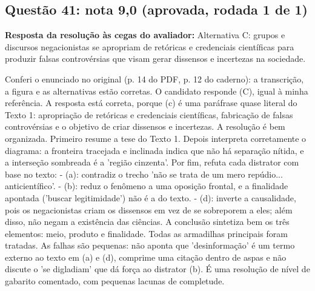\documentclass{article}%
\begin{document}
\subsection*{Questão 41: nota 9,0 (aprovada, rodada 1 de 1)}%
\textbf{Resposta da resolução às cegas do avaliador:} Alternativa C: grupos e discursos negacionistas se apropriam de retóricas e credenciais científicas para produzir falsas controvérsias que visam gerar dissensos e incertezas na sociedade.\par %
Conferi o enunciado no original (p. 14 do PDF, p. 12 do caderno): a transcrição, a figura e as alternativas estão corretas. O candidato responde (C), igual à minha referência. A resposta está correta, porque (c) é uma paráfrase quase literal do Texto 1: apropriação de retóricas e credenciais científicas, fabricação de falsas controvérsias e o objetivo de criar dissensos e incertezas.\newline%
\newline%
A resolução é bem organizada. Primeiro resume a tese do Texto 1. Depois interpreta corretamente o diagrama: a fronteira tracejada e inclinada indica que não há separação nítida, e a interseção sombreada é a 'região cinzenta'. Por fim, refuta cada distrator com base no texto:\newline%
{-} (a): contradiz o trecho 'não se trata de um mero repúdio... anticientífico'.\newline%
{-} (b): reduz o fenômeno a uma oposição frontal, e a finalidade apontada ('buscar legitimidade') não é a do texto.\newline%
{-} (d): inverte a causalidade, pois os negacionistas criam os dissensos em vez de se sobreporem a eles; além disso, não negam a existência das ciências.\newline%
\newline%
A conclusão sintetiza bem os três elementos: meio, produto e finalidade. Todas as armadilhas principais foram tratadas. As falhas são pequenas: não aponta que 'desinformação' é um termo externo ao texto em (a) e (d), comprime uma citação dentro de aspas e não discute o 'se digladiam' que dá força ao distrator (b). É uma resolução de nível de gabarito comentado, com pequenas lacunas de completude.%
\end{document}
